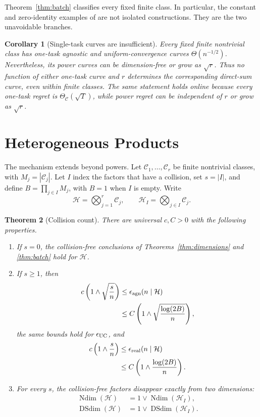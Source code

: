 \documentclass[twoside]{article}
\newtheorem{theorem}{Theorem}
\newtheorem{corollary}[theorem]{Corollary}
\newcommand{\C}{\mathcal C}
\newcommand{\Ndim}{\operatorname{Ndim}}
\newcommand{\DSdim}{\operatorname{DSdim}}
\begin{document}
Theorem~\ref{thm:batch} classifies every fixed finite class. In particular, the constant and zero-identity examples of \citet{more2026} are not isolated constructions. They are the two unavoidable branches.

\begin{corollary}[Single-task curves are insufficient]
\label{cor:insufficient}
Every fixed finite nontrivial class has one-task agnostic and uniform-convergence curves $\Theta(n^{-1/2})$. Nevertheless, its power curves can be dimension-free or grow as $\sqrt r$. Thus no function of either one-task curve and $r$ determines the corresponding direct-sum curve, even within finite classes. The same statement holds online because every one-task regret is $\Theta_{\C}(\sqrt T)$, while power regret can be independent of $r$ or grow as $\sqrt r$.
\end{corollary}

\section{Heterogeneous Products}
\label{sec:heterogeneous}

The mechanism extends beyond powers. Let $\C_1,\ldots,\C_r$ be finite nontrivial classes, with $M_j=|\C_j|$. Let $I$ index the factors that have a collision, set $s=|I|$, and define $B=\prod_{j\in I}M_j$, with $B=1$ when $I$ is empty. Write \[ \mathcal H=\bigotimes_{j=1}^r\C_j, \qquad \mathcal H_I=\bigotimes_{j\in I}\C_j. \]

\begin{theorem}[Collision count]
\label{thm:heterogeneous}
There are universal $c,C>0$ with the following properties.
\begin{enumerate}
\item If $s=0$, the collision-free conclusions of Theorems~\ref{thm:dimensions} and \ref{thm:batch} hold for $\mathcal H$.
\item If $s\geq1$, then
\begin{align*}
 c\left(1\wedge\sqrt{\frac sn}\right)
 &\leq\epsilon_{\rm agn}(n\mid\mathcal H)\\
 &\leq C\left(1\wedge\sqrt{\frac{\log(2B)}n}\right),
\end{align*}
the same bounds hold for $\epsilon_{\rm UC}$, and
\begin{align*}
 c\left(1\wedge\frac sn\right)
 &\leq\epsilon_{\rm real}(n\mid\mathcal H)\\
 &\leq C\left(1\wedge\frac{\log(2B)}n\right).
\end{align*}
\item For every $s$, the collision-free factors disappear exactly from two dimensions:
\begin{align*}
 \Ndim(\mathcal H)&=1\vee\Ndim(\mathcal H_I),\\
 \DSdim(\mathcal H)&=1\vee\DSdim(\mathcal H_I).
\end{align*}
\end{enumerate}
\end{theorem}
\end{document}
